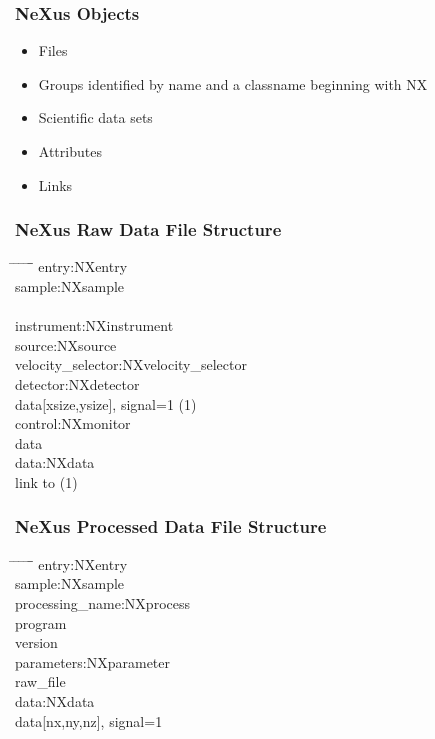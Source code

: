 \documentclass{beamer}
\begin{document}
\begin{frame} \frametitle{NeXus Objects}
\begin{itemize}
\item Files
\item Groups identified by name and a classname beginning with NX
\item Scientific data sets
\item Attributes
\item Links
\end{itemize}
\end{frame}


\begin{frame} \frametitle{NeXus Raw Data File Structure}
\begin{tabbing}
\hspace*{1cm} \= \hspace*{1cm} \= \hspace*{1cm} \= \hspace*{1cm} \= \hspace*{1cm} \= \hspace*{1cm}\= \kill
entry:NXentry \\
 \>sample:NXsample \\
\\
 \>instrument:NXinstrument\\
 \> \> source:NXsource\\
 \> \> velocity\_selector:NXvelocity\_selector\\
 \> \> detector:NXdetector \\
 \> \> \>data[xsize,ysize], signal=1 (1)\\
 \>control:NXmonitor\\
 \> \>data\\
 \>data:NXdata\\
 \> \> link to (1)\\
\end{tabbing}
\end{frame}

\begin{frame} \frametitle{NeXus Processed Data File Structure}
\begin{tabbing}
\hspace*{1cm} \= \hspace*{1cm} \= \hspace*{1cm} \= \hspace*{1cm} \= \hspace*{1cm} \= \hspace*{1cm}\= \kill
entry:NXentry \\
 \>sample:NXsample \\
 \>processing\_name:NXprocess\\
 \> \>program \\
 \> \>version \\
 \> \>parameters:NXparameter \\
 \> \> \>raw\_file \\
 \>data:NXdata\\
 \> \> data[nx,ny,nz], signal=1\\
\end{tabbing}
\end{frame}
\end{document}

